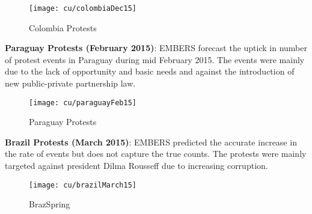 \begin{figure}[H]
\texttt{[image: cu/colombiaDec15]}
\caption{Colombia Protests}
\label{fig:colombiaDec14}
\end{figure}

\textbf{Paraguay Protests (February 2015)}:
EMBERS forecast the uptick in number of protest events in Paraguay during mid
February 2015. The events were mainly due to the lack of opportunity and basic
needs and against the introduction of new public-private partnership law.

\begin{figure}[H]
\texttt{[image: cu/paraguayFeb15]}
\caption{Paraguay Protests}
\label{fig:paraguay15}
\end{figure}

\textbf{Brazil Protests (March 2015)}: EMBERS predicted the accurate
increase in the rate of events but does not capture the true counts. The
protests were mainly targeted against president Dilma Rousseff due to
increasing corruption.


\begin{figure}[H]
\texttt{[image: cu/brazilMarch15]}
\caption{BrazSpring}
\label{fig:brazilSpring}
\end{figure}
